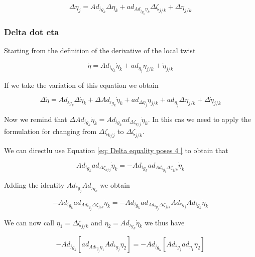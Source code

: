\documentclass[12pt,a4paper]{book}
\newcommand{\jgk}{\ensuremath{{^j g _k}}}
\renewcommand{\Adjgk}{\ensuremath{Ad_{\jgk}}}
\newcommand{\doteta}{\ensuremath{\dot{\eta}}}
\newcommand{\etajk}{\ensuremath{\eta_{j/k}}}
\begin{document}
\begin{equation}\label{eq: delta eta 4}
	\Delta \eta_j 	= Ad_{^j g_k} \Delta \eta_k + ad_{Ad_{^j g _k}  \eta_k} \Delta \zeta _{j/k} +  \Delta \eta_{j/k} 
\end{equation}


\subsubsection{Delta dot eta}

Starting from the definition of the derivative of the local twist 


\begin{equation}
	\dot{\eta} = \Adjgk \doteta_k + ad_{\eta_j} \etajk + \dot{\eta}_{j/k}
\end{equation}

If we take the variation of this equation we obtain

\begin{equation}\label{eq:Delta dot eta raw}
	\Delta \dot{\eta} = \Adjgk \Delta \doteta_k + \Delta \Adjgk \doteta_k + ad_{\Delta \eta_j} \etajk +  ad_{\eta_j} \Delta \etajk        + \Delta \dot{\eta}_{j/k}
\end{equation}

Now we remind that $\Delta \Adjgk \doteta_k = \Adjgk{} ad_{\Delta \zeta_{k/j}} \doteta _k$. In this cas we need to apply the formulation for changing from $\Delta \zeta_{k/j}$ to $\Delta \zeta_{j/k}$.

We can directlu use Equation \eqref{eq: Delta equality poses 4 } to obtain that 

\begin{equation}
	\Adjgk{} ad_{\Delta \zeta_{k/j}} \doteta _k = - \Adjgk{} ad_{Ad_{^k g _j}   \Delta \zeta _{j/k}} \doteta _k
\end{equation}

Adding the identity $Ad_{^k g _j}Ad_{^j g _k}$ we obtain  

\begin{equation}
	- \Adjgk{} ad_{Ad_{^k g _j}   \Delta \zeta _{j/k}} \doteta _k = - \Adjgk{} ad_{Ad_{^k g _j}   \Delta \zeta _{j/k}} Ad_{^k g _j}Ad_{^j g _k} \doteta _k
\end{equation}

We can now call $\eta_1 = \Delta \zeta _{j/k}$ and $\eta_2 = Ad_{^j g _k} \doteta _k$ we thus have

\begin{equation}
	- \Adjgk{} \left[ ad_{Ad_{^k g _j}  \eta_1 } Ad_{^k g _j}\eta_2 \right] = - \Adjgk{} \left[ Ad_{^k g _j} ad_{  \eta_1 } \eta_2 \right]
\end{equation}
\end{document}
